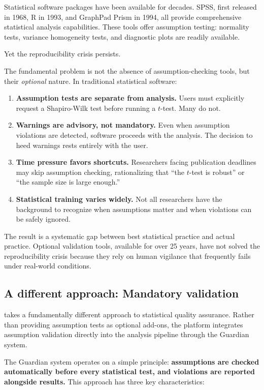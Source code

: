 \documentclass[article]{jss}
\begin{document}
Statistical software packages have been available for decades. SPSS, first released in 1968, R in 1993, and GraphPad Prism in 1994, all provide comprehensive statistical analysis capabilities. These tools offer assumption testing: normality tests, variance homogeneity tests, and diagnostic plots are readily available.

Yet the reproducibility crisis persists.

The fundamental problem is not the absence of assumption-checking tools, but their \emph{optional} nature. In traditional statistical software:

\begin{enumerate}
\item \textbf{Assumption tests are separate from analysis.} Users must explicitly request a Shapiro-Wilk test before running a $t$-test. Many do not.
\item \textbf{Warnings are advisory, not mandatory.} Even when assumption violations are detected, software proceeds with the analysis. The decision to heed warnings rests entirely with the user.
\item \textbf{Time pressure favors shortcuts.} Researchers facing publication deadlines may skip assumption checking, rationalizing that ``the $t$-test is robust'' or ``the sample size is large enough.''
\item \textbf{Statistical training varies widely.} Not all researchers have the background to recognize when assumptions matter and when violations can be safely ignored.
\end{enumerate}

The result is a systematic gap between best statistical practice and actual practice. Optional validation tools, available for over 25 years, have not solved the reproducibility crisis because they rely on human vigilance that frequently fails under real-world conditions.

\subsection{A different approach: Mandatory validation}

 takes a fundamentally different approach to statistical quality assurance. Rather than providing assumption tests as optional add-ons, the platform integrates assumption validation directly into the analysis pipeline through the Guardian system.

The Guardian system operates on a simple principle: \textbf{assumptions are checked automatically before every statistical test, and violations are reported alongside results.} This approach has three key characteristics:
\end{document}
